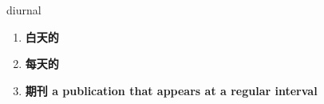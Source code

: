 
\begin{frame}
{\huge diurnal}
\begin{center}
\begin{enumerate}\Large
  \item \textbf{白天的}
  \item \textbf{每天的}
  \item \textbf{期刊 a publication that appears at a regular interval}
\end{enumerate}
\end{center}
\end{frame}
